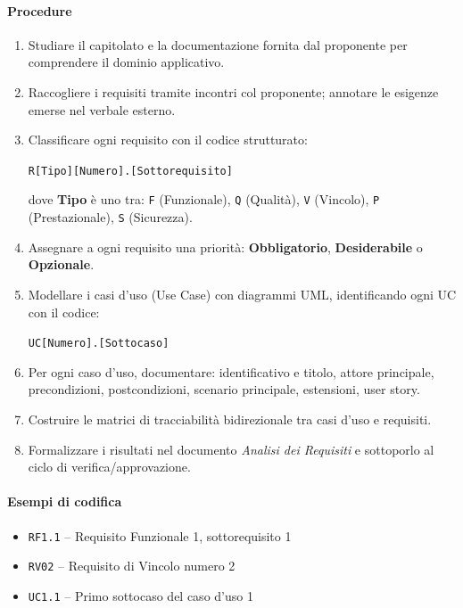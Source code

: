 \documentclass[a4paper, 11pt, oneside]{scrartcl}
\begin{document}
\paragraph{Procedure}
\begin{enumerate}
    \item Studiare il capitolato{\scriptsize{}} e la documentazione fornita dal proponente per comprendere il dominio applicativo.
    \item Raccogliere i requisiti tramite incontri col proponente; annotare le esigenze emerse nel verbale esterno.
    \item Classificare ogni requisito con il codice strutturato:
          \begin{center}
              \texttt{R[Tipo][Numero].[Sottorequisito]}
          \end{center}
          dove \textbf{Tipo} è uno tra: \texttt{F} (Funzionale), \texttt{Q} (Qualità), \texttt{V} (Vincolo), \texttt{P} (Prestazionale), \texttt{S} (Sicurezza).
    \item Assegnare a ogni requisito una priorità: \textbf{Obbligatorio}, \textbf{Desiderabile} o \textbf{Opzionale}.
    \item Modellare i casi d'uso (Use Case) con diagrammi UML{\scriptsize{}}, identificando ogni UC con il codice:
          \begin{center}
              \texttt{UC[Numero].[Sottocaso]}
          \end{center}
    \item Per ogni caso d'uso, documentare: identificativo e titolo, attore principale, precondizioni, postcondizioni, scenario principale, estensioni, user story.
    \item Costruire le matrici di tracciabilità bidirezionale tra casi d'uso e requisiti.
    \item Formalizzare i risultati nel documento \emph{Analisi dei Requisiti}{\scriptsize{}} e sottoporlo al ciclo di verifica/approvazione.
\end{enumerate}

\paragraph{Esempi di codifica}
\begin{itemize}
    \item \texttt{RF1.1} – Requisito Funzionale 1, sottorequisito 1
    \item \texttt{RV02} – Requisito di Vincolo numero 2
    \item \texttt{UC1.1} – Primo sottocaso del caso d'uso 1
\end{itemize}
\end{document}
